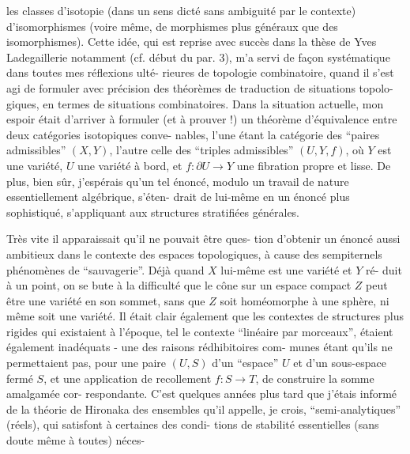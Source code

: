 
les classes d'isotopie (dans un sens dicté sans ambiguité par le
contexte) d'isomorphismes (voire même, de morphismes plus généraux
que des isomorphismes). Cette idée, qui est reprise avec succès
dans la thèse de Yves Ladegaillerie notamment (cf. début du par. 3),
m'a servi de façon systématique dans toutes mes réflexions ulté-%
rieures de topologie combinatoire, quand il s'est agi de formuler
avec précision des théorèmes de traduction de situations topolo-%
giques, en termes de situations combinatoires. Dans la situation
actuelle, mon espoir était d'arriver à formuler (et à prouver !)
un théorème d'équivalence entre deux catégories isotopiques conve-%
nables, l'une étant la catégorie des ``paires admissibles'' $(X,Y)$,
l'autre celle des ``triples admissibles'' $(U,Y,f)$, où $Y$ est une
variété, $U$ une variété à bord, et $f : \partial U \longrightarrow Y$ une fibration
propre et lisse. De plus, bien sûr, j'espérais qu'un tel énoncé,
modulo un travail de nature essentiellement algébrique, s'éten-%
drait de lui-même en un énoncé plus sophistiqué, s'appliquant aux
structures stratifiées générales.

Très vite il apparaissait qu'il ne pouvait être ques-%
tion d'obtenir un énoncé aussi ambitieux dans le contexte des
espaces topologiques, à cause des sempiternels phénomènes de
``sauvagerie''. Déjà quand $X$ lui-même est une variété et $Y$ ré-%
duit à un point, on se bute à la difficulté que le cône sur un
espace compact $Z$ peut être une variété en son sommet, sans que
$Z$ soit homéomorphe à une sphère, ni même soit une variété. Il
était clair également que les contextes de structures plus rigides
qui existaient à l'époque, tel le contexte ``linéaire par morceaux'',
étaient également inadéquats - une des raisons rédhibitoires com-%
munes étant qu'ils ne permettaient pas, pour une paire $(U,S)$
d'un ``espace'' $U$ et d'un sous-espace fermé $S$, et une application
de recollement $f : S \longrightarrow T$, de construire la somme amalgamée cor-%
respondante. C'est quelques années plus tard que j'étais informé
de la théorie de Hironaka des ensembles qu'il appelle, je crois,
``semi-analytiques'' (réels), qui satisfont à certaines des condi-%
tions de stabilité essentielles (sans doute même à toutes) néces-

